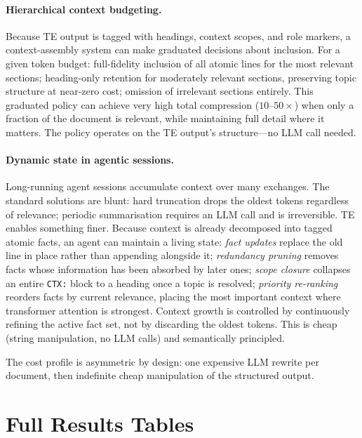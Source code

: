\documentclass{article}
\begin{document}
\paragraph{Hierarchical context budgeting.}
Because TE output is tagged with headings, context scopes, and role markers, a context-assembly system can make graduated decisions about inclusion. For a given token budget: full-fidelity inclusion of all atomic lines for the most relevant sections; heading-only retention for moderately relevant sections, preserving topic structure at near-zero cost; omission of irrelevant sections entirely. This graduated policy can achieve very high total compression ($10$--$50\times$) when only a fraction of the document is relevant, while maintaining full detail where it matters. The policy operates on the TE output's structure---no LLM call needed.

\paragraph{Dynamic state in agentic sessions.}
Long-running agent sessions accumulate context over many exchanges. The standard solutions are blunt: hard truncation drops the oldest tokens regardless of relevance; periodic summarisation requires an LLM call and is irreversible. TE enables something finer. Because context is already decomposed into tagged atomic facts, an agent can maintain a living state: \emph{fact updates} replace the old line in place rather than appending alongside it; \emph{redundancy pruning} removes facts whose information has been absorbed by later ones; \emph{scope closure} collapses an entire \texttt{CTX:} block to a heading once a topic is resolved; \emph{priority re-ranking} reorders facts by current relevance, placing the most important context where transformer attention is strongest. Context growth is controlled by continuously refining the active fact set, not by discarding the oldest tokens. This is cheap (string manipulation, no LLM calls) and semantically principled.

The cost profile is asymmetric by design: one expensive LLM rewrite per document, then indefinite cheap manipulation of the structured output.

\section{Full Results Tables}
\label{app:tables}
\end{document}
